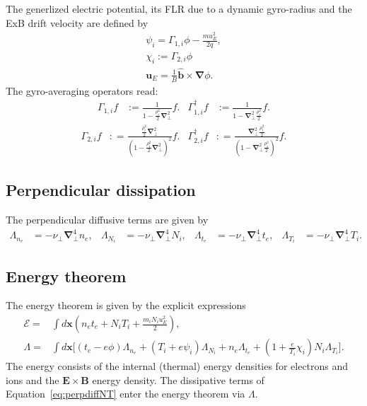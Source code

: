 \documentclass{hitec} %
\renewcommand{\vec}[1]{\boldsymbol{#1}}
\begin{document}
The generlized electric potential, its FLR due to a dynamic gyro-radius and the ExB drift velocity are defined by
\begin{align}
 \psi_i  = \Gamma_{1,i} \phi - \frac{m u_E^2 }{2 q}, \\ 
 \chi_i := \Gamma_{2,i} \phi \\
 \vec{u}_E = \frac{1}{B} \vec{\hat{b}} \times \vec{\nabla} \phi .
\end{align}
The gyro-averaging operators read:
\begin{align}\label{eq:gamma1def} 
 \Gamma_{1,i} f&:= \frac{1}{1-\frac{\rho_i^2}{2}\vec{\nabla}_\perp^2} f. & 
  \Gamma_{1,i}^\dagger f&:= \frac{1}{1-\vec{\nabla}_\perp^2\frac{\rho_i^2}{2}} f.
\end{align}
\begin{align}\label{eq:gamma2def}
 \Gamma_{2,i} f&: = \frac{\frac{\rho_i^2}{2}\vec{\nabla}_\perp^2}{\left(1-\frac{\rho_i^2}{2}\vec{\nabla}_\perp^2\right)^2} f.&
 \Gamma_{2,i}^\dagger f&: = \frac{\vec{\nabla}_\perp^2\frac{\rho_i^2}{2}}{\left(1-\vec{\nabla}_\perp^2\frac{\rho_i^2}{2}\right)^2} f. 
\end{align}
\subsection{Perpendicular dissipation}
The perpendicular diffusive terms are given by
\begin{align}\label{eq:perpdiffNT}
 \Lambda_{n_e} &=  -\nu_\perp \vec{\nabla}_\perp^4 n_e, &
 \Lambda_{N_i} &=  -\nu_\perp \vec{\nabla}_\perp^4 N_i, &
 \Lambda_{t_e} &=  -\nu_\perp \vec{\nabla}_\perp^4 t_e, &
 \Lambda_{T_i} &=  -\nu_\perp \vec{\nabla}_\perp^4 T_i.
\end{align}
\subsection{Energy theorem}
The energy theorem is given by the explicit expressions
\begin{align}\label{eq:energytheorem}
 \mathcal{E} =& \int d\vec{x} \left(n_e t_{e} +N_i T_{i} + \frac{m_i N_i u_E^2}{2} \right) , \\
\Lambda = &
 \int d\vec{x}  \bigg[\left(t_{e} - e \phi \right) \Lambda_{n_e}  +\left(T_{i} + e \psi_i \right) \Lambda_{N_i}  +
  n_e  \Lambda_{t_{e}}+ 
 \left(1+\frac{e}{T_{i}} \chi_i\right)N_i  \Lambda_{T_{i}}\bigg].
\end{align}
The energy consists of the internal (thermal) energy densities for electrons and ions and the $\vec{E}\times\vec{B}$ energy density. 
The dissipative terms of Equation~\eqref{eq:perpdiffNT} enter the energy theorem via $\Lambda$. \\
\end{document}
